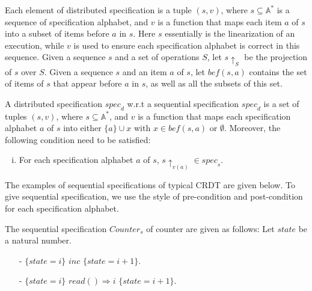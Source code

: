  Each element of distributed specification is a tuple $(s,v)$, where $s \subseteq \mathbb{A}^*$ is a sequence of specification alphabet, and $v$ is a function that maps each item $a$ of $s$ into a subset of items before $a$ in $s$. Here $s$ essentially is the linearization of an execution, while $v$ is used to ensure each specification alphabet is correct in this sequence. %
Given a sequence $s$ and a set of operations $S$, let $s \uparrow_{S}$ be the projection of $s$ over $S$. Given a sequence $s$ and an item $a$ of $s$, let $\mathit{bef}(s,a)$ contains the set of items of $s$ that appear before $a$ in $s$, as well as all the subsets of this set.

\begin{definition}
\label{definition:distributed specification}
A distributed specification $\mathit{spec}_d$ w.r.t a sequential specification $\mathit{spec}_d$ is a set of tuples $(s,v)$, where $s \subseteq \mathbb{A}^*$, and %
$v$ is a function that maps each specification alphabet $a$ of $s$ into either $\{ a \} \cup x$ with $ x \in \mathit{bef}(s,a)$ or $\emptyset$. Moreover, the following condition need to be satisfied:

\begin{enumerate}[(i)]
\item For each specification alphabet $a$ of $s$, $s \uparrow_{v(a)} \in \mathit{spec}_s$.
\end{enumerate}
\end{definition}

The examples of sequential specifications of typical CRDT are given below. To give sequential specification, we use the style of pre-condition and post-condition for each specification alphabet.


\begin{example}[Counter]
\label{definition:sequential specification of counter}
The sequential specification $\mathit{Counter}_s$ of counter are given as follows: Let $state$ be a natural number.

\begin{itemize}
\setlength{\itemsep}{0.5pt}
\item[-] $\{ state = i \}$ $inc$ $\{ state = i+1 \}$.
\item[-] $\{ state = i \}$ $read() \Rightarrow i$ $\{ state = i+1 \}$.
\end{itemize}
\end{example}


